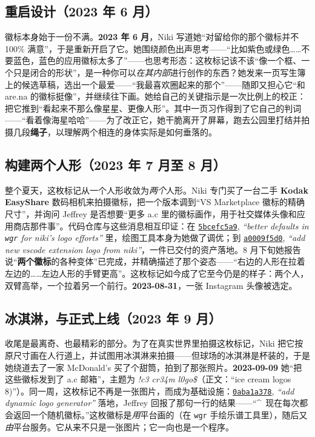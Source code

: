 \documentclass[10pt,letterpaper,twocolumn]{article}
\newcommand{\commit}[2]{\href{https://github.com/whistlegraph/aesthetic-computer/commit/#1}{\texttt{#1}}, \emph{``#2''}}
\begin{document}
\subsection{重启设计（2023 年 6 月）}
徽标本身始于一份不满。\textbf{2023 年 6 月}，Niki 写道她“对留给你的那个徽标并不 100\% 满意”，于是重新开启了它。她围绕颜色出声思考——“比如紫色或绿色……不要蓝色，蓝色的应用徽标太多了”——也思考形态：这枚标记该不该“像一个框、一个只是闭合的形状”，是一种你可以\emph{在其内部}进行创作的东西？她发来一页写生簿上的候选草稿，选出一个最爱——“我最喜欢圈起来的那个”——随即又担心它“和 are.na 的徽标挺像”，并继续往下画。她给自己的关键指示是一次比例上的校正：把它推到“看起来不那么像星星、更像人形”。其中一页习作得到了它自己的判词——“看着像海星哈哈”——为了改正它，她干脆离开了屏幕，跑去公园里打结并拍摄几段\textbf{绳子}，以理解两个相连的身体实际是如何垂落的。

\subsection{构建两个人形（2023 年 7 月至 8 月）}
整个夏天，这枚标记从一个人形收敛为\emph{两个}人形。Niki 专门买了一台二手 \textbf{Kodak EasyShare} 数码相机来拍摄徽标，把一个版本调到“VS Marketplace 徽标的精确尺寸”，并询问 Jeffrey 是否想要“更多 a.c 里的徽标画作，用于社交媒体头像和应用商店那件事”。代码仓库与这些消息相互印证：在 \commit{5bcefc5a9}{better defaults in \texttt{wgr} for niki's logo efforts} 里，绘图工具本身为她做了调优；到 \commit{a0009f5d0}{add new vscode extension logo from niki}，一件已交付的资产落地。8 月下旬她报告说“\textbf{两个徽标}的各种变体”已完成，并精确描述了那个姿态——“右边的人形在拉着左边的……左边人形的手臂更高”。这枚标记如今成了它至今仍是的样子：两个人，双臂高举，一个拉着另一个前行。\textbf{2023-08-31}，一张 Instagram 头像被选定。

\subsection{冰淇淋，与正式上线（2023 年 9 月）}
收尾是最离奇、也最精彩的部分。为了在真实世界里拍摄这枚标记，Niki 把它按原尺寸画在人行道上，并试图用冰淇淋来拍摄——但球场的冰淇淋是杯装的，于是她绕道去了一家 McDonald's 买了个甜筒，拍到了那张照片。\textbf{2023-09-09} 她“把这些徽标发到了 a.c 邮箱”，主题为 \emph{!c3 cr34m l0go\$}（正文：“ice cream logos 8)”）。同一周，这枚标记不再是一张图片，而成为基础设施：\commit{0aba1a378}{add dynamic logo generator} 落地，Jeffrey 回报了那句一行的结果——“\^{}\ 现在每次都会返回一个随机徽标。”这枚徽标是\emph{用}平台画的（在 \texttt{wgr} 手绘乐谱工具里），随后又\emph{由}平台服务。它从来不只是一张图片；它一向也是一个程序。
\end{document}
